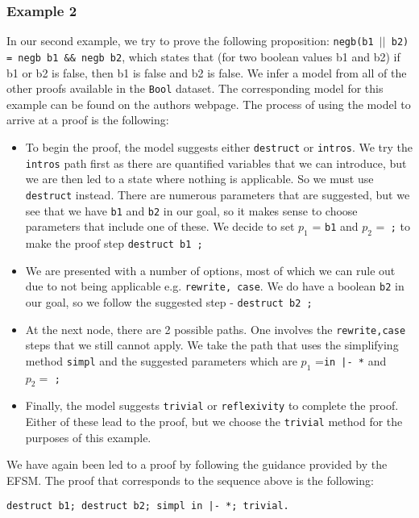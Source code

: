 \documentclass{llncs}
\begin{document}
\subsubsection{Example 2} In our second example, we try to prove the following proposition: \texttt{negb(b1 $||$ b2) = negb b1 \&\& negb b2}, which states that (for two boolean values b1 and b2) if b1 or b2 is false, then b1 is false and b2 is false. We infer a model from all of the other proofs available in the \texttt{Bool} dataset. The corresponding model for this example can be found on the authors webpage\footnotemark[1]. The process of using the model to arrive at a proof is the following:
\begin{itemize}
\item{To begin the proof, the model suggests either \texttt{destruct} or \texttt{intros}. We try the \texttt{intros} path first as there are quantified variables that we can introduce, but we are then led to a state where nothing is applicable. So we must use \texttt{destruct} instead. There are numerous parameters that are suggested, but we see that we have \texttt{b1} and \texttt{b2} in our goal, so it makes sense to choose parameters that include one of these. We decide to set $p_1$ = \texttt{b1} and $p_2$ =\texttt{ ;} to make the proof step \texttt{destruct b1 ;}}
\item{We are presented with a number of options, most of which we can rule out due to not being applicable e.g. \texttt{rewrite, case}. We do have a boolean \texttt{b2} in our goal, so we follow the suggested step - \texttt{destruct b2 ;} }
\item{At the next node, there are 2 possible paths. One involves the \texttt{rewrite,case} steps that we still cannot apply. We take the path that uses the simplifying method \texttt{simpl} and the suggested parameters which are $p_1$ ={\tt in |- *} and $p_2 =$ {\tt ;}}
\item{Finally, the model suggests {\tt trivial} or {\tt reflexivity} to complete the proof. Either of these lead to the proof, but we choose the {\tt trivial} method for the purposes of this example.}
\end{itemize}
We have again been led to a proof by following the guidance provided by the EFSM. The proof that corresponds to the sequence above is the following:

\vspace{2mm}
\noindent\texttt{destruct b1; destruct b2; simpl in |- *; trivial.}
\vspace{2mm}
\end{document}

